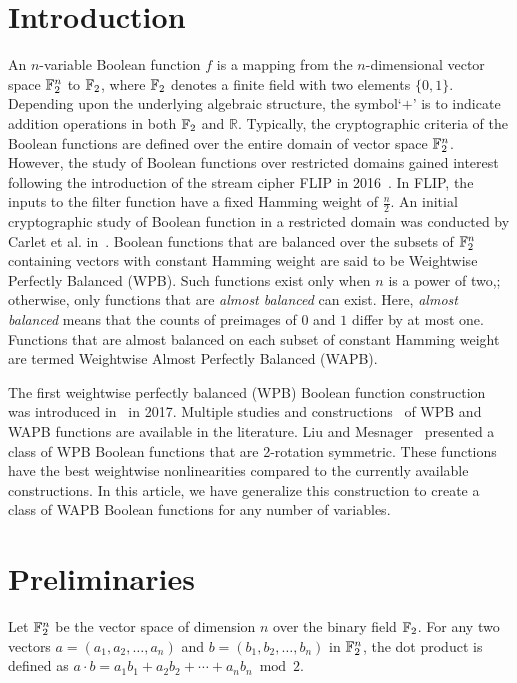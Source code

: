 \documentclass{llncs}
\begin{document}
\section{Introduction}
An $n$-variable Boolean function $f$ is a mapping from the $n$-dimensional vector space $\mathbb{F}_2^n$ to $\mathbb{F}_2$, where $\mathbb{F}_2$ denotes a finite field with two elements $\{0,1\}$. Depending upon the underlying algebraic structure, the symbol`$+$' is to indicate addition operations in both $\mathbb{F}_2$ and $\mathbb{R}$. 
Typically, the cryptographic criteria of the Boolean functions are defined over the entire domain of vector space $\mathbb{F}_2^n$. However, the study of Boolean functions over restricted domains gained interest following the introduction of the stream cipher FLIP in 2016~\cite{EC:MJSC16}.
In FLIP, the inputs to the filter function have a fixed Hamming weight of $\frac{n}{2}$.  
An initial cryptographic study of Boolean function in a restricted domain was conducted by Carlet et al. in~\cite{TOSC:CarMeaRot17}.
Boolean functions that are balanced over the subsets of $\mathbb{F}_2^n$ containing vectors with constant Hamming weight are said to be Weightwise Perfectly Balanced (WPB). 
Such functions exist only when $n$ is a power of two,; otherwise, only functions that are \textit{almost balanced} can exist. Here, \textit{almost balanced} means that the counts of preimages of $0$ and $1$ differ by at most one. Functions that are almost balanced on each subset of constant Hamming weight are termed Weightwise Almost Perfectly Balanced (WAPB).

The first weightwise perfectly balanced (WPB) Boolean function construction was introduced in~\cite{TOSC:CarMeaRot17} in 2017. 
Multiple studies and constructions~\cite{CC:TangLiu19,DCC:LiuMes19,
DAM:LiSu20,CC:MesSu21,DAM:Su21,DAM:ZhuSu22,DAM:GinMea22,CEC:MPJDL22,ACI:ManKuLar22,INDO:GinMea22,CC:MSLZ22,DAM:GuoSu22,C2SI:GinMea23,Latin:GinMea23,DAM:ZLCQZ23,BFA:DM23,AMC:ZhangSu23,Mat:ZJZQ23,ASIACCS:YCL+23,CCDS:GinMea24,AMC:DM24,SAC:Meaux24} of WPB and WAPB functions are available in the literature.
Liu and Mesnager~\cite{DCC:LiuMes19} presented a class of WPB Boolean functions that are 2-rotation symmetric. These functions have the best weightwise nonlinearities compared to the currently available constructions. In this article, we have generalize this construction to create a class of WAPB Boolean functions for any number of variables.


\section{Preliminaries}
Let $\mathbb{F}_2^n$ be the vector space of dimension $n$ over the binary field $\mathbb{F}_2$. For any two vectors $a=(a_1, a_2, \ldots, a_n)$ and $b = (b_1, b_2, \ldots, b_n)$ in $\mathbb{F}_2^n$, the dot product is defined as $a\cdot b = a_1 b_1 + a_2 b_2 + \cdots + a_nb_n \bmod 2$.
\end{document}
